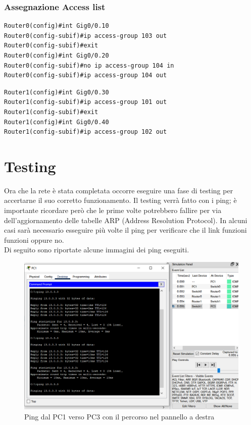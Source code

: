 \documentclass[a4paper,12pt]{report}
\begin{document}
\subsection{Assegnazione Access list}
\begin{verbatim}
Router0(config)#int Gig0/0.10
Router0(config-subif)#ip access-group 103 out
Router0(config-subif)#exit
Router0(config)#int Gig0/0.20
Router0(config-subif)#no ip access-group 104 in
Router0(config-subif)#ip access-group 104 out    
\end{verbatim}
\begin{verbatim}
Router1(config)#int Gig0/0.30
Router1(config-subif)#ip access-group 101 out
Router1(config-subif)#exit
Router1(config)#int Gig0/0.40
Router1(config-subif)#ip access-group 102 out
\end{verbatim}
\chapter{Testing}
\label{chap:testing}
Ora che la rete è stata completata occorre eseguire una fase di testing per accertarne il suo corretto funzionamento.
%
Il testing verrà fatto con i ping; è importante ricordare però che le prime volte potrebbero fallire per via dell'aggiornamento delle tabelle ARP (Address Resolution Protocol).
%
In alcuni casi sarà necessario esseguire più volte il ping per verificare che il link funzioni funzioni oppure no.
%
\\Di seguito sono riportate alcune immagini dei ping eseguiti.
\begin{figure}[H]
\includegraphics[width=\textwidth]{pc1_pc3_ping_successful.png}
\caption{Ping dal PC1 verso PC3 con il percorso nel pannello a destra}
\label{fig:pc3_ping_successful}
\end{figure}
\end{document}
